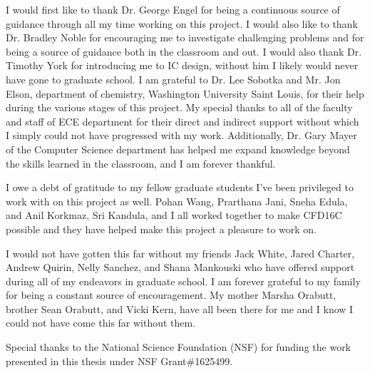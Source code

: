 \documentclass[12pt,oneside,final]{siuethesis}
\theoremstyle{definition}
\begin{document}
\begin{acknowledgements} 

\par I would first like to thank Dr. George Engel for being a continuous source of guidance through all my time working on this project. I would also like to thank Dr. Bradley Noble for encouraging me to investigate challenging problems and for being a source of guidance both in the classroom and out. I would also thank Dr. Timothy York for introducing me to IC design, without him I likely would never have gone to graduate school. I am grateful to  Dr.  Lee  Sobotka  and  Mr.  Jon  Elson,  department  of  chemistry, Washington  University Saint Louis, for their  help  during  the  various  stages  of  this  project. My  special  thanks  to all of the  faculty  and  staff  of  ECE  department  for  their  direct  and indirect support without which I simply could not have progressed with my work. Additionally, Dr. Gary Mayer of the Computer Science department has helped me expand knowledge beyond the skills learned in the classroom, and I am forever thankful. 
\par I owe a debt of gratitude to my fellow graduate students I've been privileged to work with on this project as well. Pohan Wang, Prarthana Jani, Sneha Edula, and Anil Korkmaz, Sri Kandula, and I all worked together to make CFD16C possible and they have helped make this project a pleasure to work on.
\par I would not have gotten this far without my friends Jack White, Jared Charter, Andrew Quirin, Nelly Sanchez, and Shana Mankouski who have offered support during all of my endeavors in graduate school. I am forever grateful to my family for being a constant source of encouragement. My mother Marsha Orabutt, brother Sean Orabutt, and Vicki Kern, have all been there for me and I know I could not have come this far without them.
\par Special thanks to the National Science Foundation (NSF) for funding the work presented in this thesis under NSF Grant\#1625499.

\end{acknowledgements}

\tableofcontents

\cleardoublepage %

\cleardoublepage

\listoffigures %

\cleardoublepage
\end{document}
